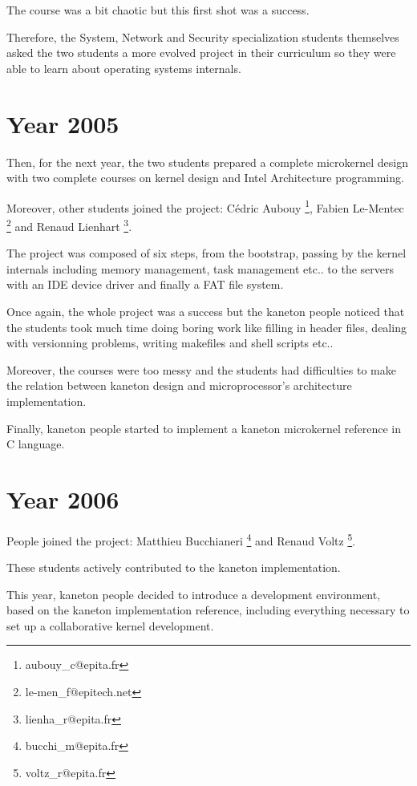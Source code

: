 The course was a bit chaotic but this first shot was a success.

Therefore, the System, Network and Security specialization students
themselves asked the two students a more evolved project in their
curriculum so they were able to learn about operating systems internals.

%
%

\section{Year 2005}

Then, for the next year, the two students prepared a complete microkernel
design with two complete courses on kernel design and Intel Architecture
programming.

Moreover, other students joined the project:
C\'edric Aubouy
  \footnote{aubouy\_c@epita.fr},
Fabien Le-Mentec
  \footnote{le-men\_f@epitech.net} and
Renaud Lienhart
  \footnote{lienha\_r@epita.fr}.

The project was composed of six steps, from the bootstrap, passing by
the kernel internals including memory management, task management etc..
to the servers with an IDE device driver and finally a FAT file system.

Once again, the whole project was a success but the kaneton people
noticed that the students took much time doing boring work like
filling in header files, dealing with versionning problems, writing
makefiles and shell scripts etc..

Moreover, the courses were too messy and the students had difficulties
to make the relation between kaneton design and microprocessor's
architecture implementation.

Finally, kaneton people started to implement a kaneton microkernel
reference in C language.

%
%

\section{Year 2006}

People joined the project:
Matthieu Bucchianeri
  \footnote{bucchi\_m@epita.fr} and
Renaud Voltz
  \footnote{voltz\_r@epita.fr}.

These students actively contributed to the kaneton implementation.

This year, kaneton people decided to introduce a development environment,
based on the kaneton implementation reference, including everything
necessary to set up a collaborative kernel development.

